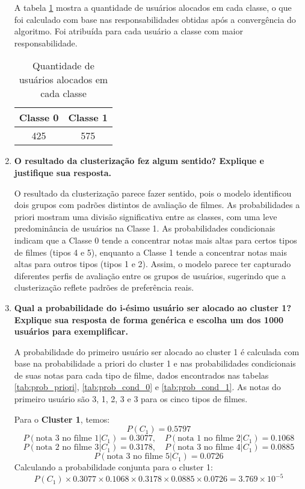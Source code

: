 \begin{enumerate}[label=(\alph*)]
A tabela \ref{tab:qtd_usuarios} mostra a quantidade de usuários alocados em cada classe, o que foi calculado com base nas responsabilidades obtidas após a convergência do algoritmo. Foi atribuída para cada usuário a classe com maior responsabilidade.

\begin{table}[H]
    \centering
    \caption{Quantidade de usuários alocados em cada classe}
    \begin{tabular}{cc}
        \hline
        Classe 0 & Classe 1 \\
        \hline
        425 & 575 \\
        \hline
    \end{tabular}
    \label{tab:qtd_usuarios}
\end{table}


    \item \textbf{O resultado da clusterização fez algum sentido? Explique e justifique sua resposta.}
    
    O resultado da clusterização parece fazer sentido, pois o modelo identificou dois grupos com padrões distintos de avaliação de filmes. As probabilidades a priori mostram uma divisão significativa entre as classes, com uma leve predominância de usuários na Classe 1. As probabilidades condicionais indicam que a Classe 0 tende a concentrar notas mais altas para certos tipos de filmes (tipos 4 e 5), enquanto a Classe 1 tende a concentrar notas mais altas para outros tipos (tipos 1 e 2). Assim, o modelo parece ter capturado diferentes perfis de avaliação entre os grupos de usuários, sugerindo que a clusterização reflete padrões de preferência reais.

    \item \textbf{Qual a probabilidade do i-ésimo usuário ser alocado ao cluster 1? Explique sua resposta de forma genérica e escolha um dos 1000 usuários para exemplificar.}
    
    A probabilidade do primeiro usuário ser alocado ao cluster 1 é calculada com base na probabilidade a priori do cluster 1 e nas probabilidades condicionais de suas notas para cada tipo de filme, dados encontrados nas tabelas \ref{tab:prob_priori}, \ref{tab:prob_cond_0} e \ref{tab:prob_cond_1}. As notas do primeiro usuário são 3, 1, 2, 3 e 3 para os cinco tipos de filmes.

    Para o \textbf{Cluster 1}, temos:
    \[
    P(C_1) = 0.5797
    \]
    \[
    P(\text{nota 3 no filme 1}|C_1) = 0.3077, \quad P(\text{nota 1 no filme 2}|C_1) = 0.1068
    \]
    \[
    P(\text{nota 2 no filme 3}|C_1) = 0.3178, \quad P(\text{nota 3 no filme 4}|C_1) = 0.0885
    \]
    \[
    P(\text{nota 3 no filme 5}|C_1) = 0.0726
    \]
    Calculando a probabilidade conjunta para o cluster 1:
    \[
    P(C_1) \times 0.3077 \times 0.1068 \times 0.3178 \times 0.0885 \times 0.0726 = 3.769 \times 10^{-5}
    \]
    

\end{enumerate}
